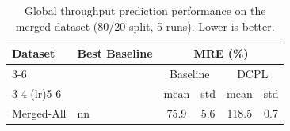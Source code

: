 \begin{table}[t]
\centering
\small
\setlength{\tabcolsep}{5pt}
\renewcommand{\arraystretch}{1.2}
\begin{tabular}{llcccc}
\toprule
\textbf{Dataset} & \textbf{Best Baseline} & \multicolumn{4}{c}{\textbf{MRE (\%)}} \\
\cmidrule(lr){3-6}
 &  & \multicolumn{2}{c}{Baseline} & \multicolumn{2}{c}{DCPL} \\
\cmidrule(lr){3-4} \cmidrule(lr){5-6}
 &  & mean & std & mean & std \\
\midrule
Merged-All & nn & 75.9 & 5.6 & 118.5 & 0.7 \\
\bottomrule
\end{tabular}
\caption{Global throughput prediction performance on the merged dataset (80/20 split, 5 runs). Lower is better.}
\label{tab:global_mre_baseline_vs_dcpl}
\end{table}

